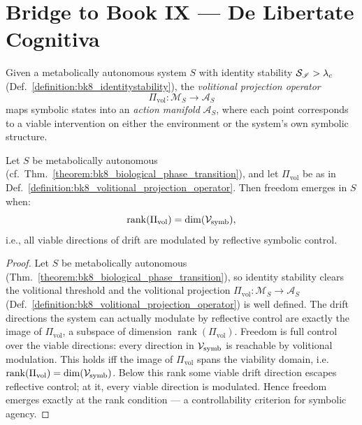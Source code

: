 \section[Bridge to Book IX]{Bridge to Book IX — De Libertate Cognitiva}
\label{sec:bk8_bridge_to_book_ix}
\begin{definition}
\label{definition:bk8_volitional_projection_operator}
Given a metabolically autonomous system $S$ with identity stability $\mathcal{S}_{\mathscr{I}} > \lambda_c$ (Def.~\ref{definition:bk8_identitystability}), the \emph{volitional projection operator}
\[
\Pi_{\text{vol}} : \mathcal{M}_S \to \mathcal{A}_S
\]
maps symbolic states into an \emph{action manifold} $\mathcal{A}_S$, where each point corresponds to a viable intervention on either the environment or the system’s own symbolic structure.
\end{definition}
\begin{theorem}
\label{theorem:bk8_freedom_emergence_criterion}
\leavevmode\newline
Let $S$ be metabolically autonomous
(cf.~Thm.~\ref{theorem:bk8_biological_phase_transition}), and let
$\Pi_{\text{vol}}$ be as in
Def.~\ref{definition:bk8_volitional_projection_operator}.
Then freedom emerges in $S$ when:
\[
\operatorname{rank}(\Pi_{\text{vol}}) = \dim(\mathcal{V}_{\mathrm{symb}}),
\]
i.e., all viable directions of drift are modulated by reflective symbolic control.
\end{theorem}
\begin{proof}
\label{proof:bk8_freedom_emergence_criterion}
\leavevmode
Let $S$ be metabolically autonomous (Thm.~\ref{theorem:bk8_biological_phase_transition}), so identity stability clears the volitional threshold and the volitional projection $\Pi_{\text{vol}}:\mathcal{M}_S\to\mathcal{A}_S$ (Def.~\ref{definition:bk8_volitional_projection_operator}) is well defined. The drift directions the system can actually modulate by reflective control are exactly the image of $\Pi_{\text{vol}}$, a subspace of dimension $\operatorname{rank}(\Pi_{\text{vol}})$. Freedom is full control over the viable directions: every direction in $\mathcal{V}_{\mathrm{symb}}$ is reachable by volitional modulation. This holds iff the image of $\Pi_{\text{vol}}$ spans the viability domain, i.e.\ $\operatorname{rank}(\Pi_{\text{vol}})=\dim(\mathcal{V}_{\mathrm{symb}})$. Below this rank some viable drift direction escapes reflective control; at it, every viable direction is modulated. Hence freedom emerges exactly at the rank condition --- a controllability criterion for symbolic agency.
\end{proof}
